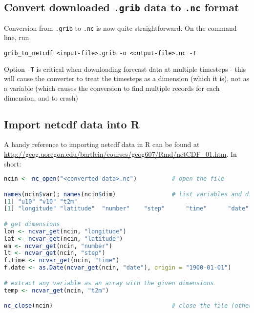 \documentclass[10pt,fleqn]{article}
\begin{document}
\subsection{Convert downloaded \texttt{.grib} data to \texttt{.nc} format}

Conversion from \texttt{.grib} to \texttt{.nc} is now quite straightforward. On the command line, run

\texttt{grib\_to\_netcdf <input-file>.grib -o <output-file>.nc -T}

Option \texttt{-T} is critical when downloading forecast data at multiple timesteps - this will cause the converter to treat the timesteps as a dimension (which it is), not as a variable (which causes the conversion to find multiple records for each dimension, and to crash)

\subsection{Import netcdf data into R}

A handy reference to importing netcdf data in R can be found at \url{http://geog.uoregon.edu/bartlein/courses/geog607/Rmd/netCDF_01.htm}. In short:

\begin{lstlisting}[language = R]
ncin <- nc_open("<converted-data>.nc")			# open the file

names(ncin$var); names(ncin$dim)				# list variables and dimensions
[1] "u10" "v10" "t2m"
[1] "longitude" "latitude"  "number"    "step"      "time"      "date"

# get dimensions
lon <- ncvar_get(ncin, "longitude")         
lat <- ncvar_get(ncin, "latitude")
em <- ncvar_get(ncin, "number")                                         # ensemble members
lt <- ncvar_get(ncin, "step")                                           # time steps (look-ahead time)
f.time <- ncvar_get(ncin, "time")                                       # times that forecast was made
f.date <- as.Date(ncvar_get(ncin, "date"), origin = "1900-01-01")       # dates that forecast was made

# extract any variable as an array with the given dimensions
temp <- ncvar_get(ncin, "t2m")

nc_close(ncin)									# close the file (otherwise it will stay open in your workspace) 
\end{lstlisting}
\end{document}
